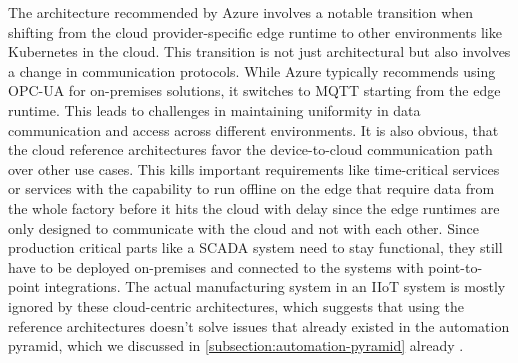     The architecture recommended by Azure involves a notable transition when shifting from the cloud provider-specific edge runtime to other environments like Kubernetes in the cloud. This transition is not just architectural but also involves a change in communication protocols. While Azure typically recommends using OPC-UA for on-premises solutions, it switches to MQTT starting from the edge runtime. This leads to challenges in maintaining uniformity in data communication and access across different environments. It is also obvious, that the cloud reference architectures favor the device-to-cloud communication path over other use cases. This kills important requirements like time-critical services or services with the capability to run offline on the edge that require data from the whole factory before it hits the cloud with delay since the edge runtimes are only designed to communicate with the cloud and not with each other. Since production critical parts like a SCADA system need to stay functional, they still have to be deployed on-premises and connected to the systems with point-to-point integrations. The actual manufacturing system in an IIoT system is mostly ignored by these cloud-centric architectures, which suggests that using the reference architectures doesn't solve issues that already existed in the automation pyramid, which we discussed in \autoref{subsection:automation-pyramid} already \cite{microsoft_azure_iot_reference, iot_edge_docs, microsoft_industrial_connectivity}.